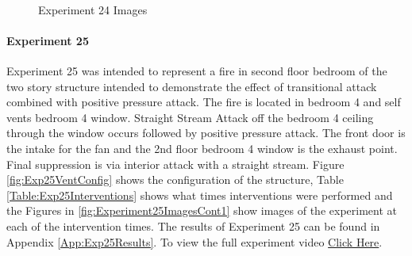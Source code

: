 \documentclass{article}
\begin{document}
\clearpage

\begin{figure}[H]
	\ContinuedFloat 
	\centering 
	 \ 
	\caption{Experiment 24 Images}
	\label{fig:Experiment24ImagesCont3} 
\end{figure}

\paragraph{Experiment 25}\mbox{}

Experiment 25 was intended to represent a fire in second floor bedroom of the two story structure intended to demonstrate the effect of transitional attack combined with positive pressure attack. The fire is located in bedroom 4 and self vents bedroom 4 window. Straight Stream Attack off the bedroom 4 ceiling through the window occurs followed by positive pressure attack. The front door is the intake for the fan and the 2nd floor bedroom 4 window is the exhaust point. Final suppression is via interior attack with a straight stream. Figure \ref{fig:Exp25VentConfig} shows the configuration of the structure, Table \ref{Table:Exp25Interventions} shows what times interventions were performed and the Figures in \ref{fig:Experiment25ImagesCont1} show images of the experiment at each of the intervention times. The results of Experiment 25 can be found in Appendix \ref{App:Exp25Results}. To view the full experiment video \href{https://youtu.be/vMflFNnWxHU}{Click Here}.
\end{document}
